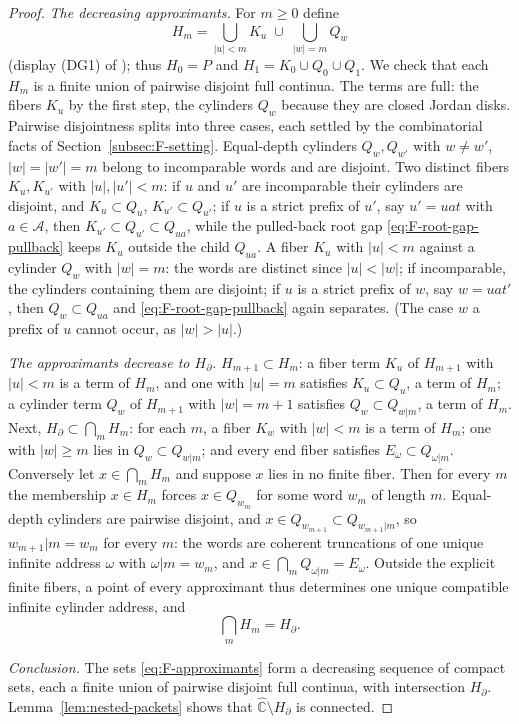 \documentclass[11pt,reqno]{amsart}
\theoremstyle{definition}
\theoremstyle{remark}
\newcommand{\Chat}{\widehat{\mathbb C}}
\begin{document}
\begin{proof}
\emph{The decreasing approximants.}
For $m\ge0$ define
\begin{equation}\label{eq:F-approximants}
H_m=\bigcup_{|u|<m}K_u\;\cup\;\bigcup_{|w|=m}Q_w
\end{equation}
(display (DG1) of \cite{MWman}); thus $H_0=P$ and
$H_1=K_0\cup Q_0\cup Q_1$.  We check that each $H_m$ is a finite union of
pairwise disjoint full continua.  The terms are full: the fibers $K_u$ by
the first step, the cylinders $Q_w$ because they are closed Jordan disks.
Pairwise disjointness splits into three cases, each settled by the
combinatorial facts of Section~\ref{subsec:F-setting}.
Equal-depth cylinders $Q_w,Q_{w'}$ with $w\ne w'$, $|w|=|w'|=m$ belong to
incomparable words and are disjoint.  Two distinct fibers $K_u,K_{u'}$
with $|u|,|u'|<m$: if $u$ and $u'$ are incomparable their cylinders are
disjoint, and $K_u\subset Q_u$, $K_{u'}\subset Q_{u'}$; if $u$ is a
strict prefix of $u'$, say $u'=uat$ with $a\in\mathcal A$, then
$K_{u'}\subset Q_{u'}\subset Q_{ua}$, while the pulled-back root gap
\eqref{eq:F-root-gap-pullback} keeps $K_u$ outside the child $Q_{ua}$.
A fiber $K_u$ with $|u|<m$ against a cylinder $Q_w$ with $|w|=m$: the
words are distinct since $|u|<|w|$; if incomparable, the cylinders
containing them are disjoint; if $u$ is a strict prefix of $w$, say
$w=uat'$, then $Q_w\subset Q_{ua}$ and \eqref{eq:F-root-gap-pullback}
again separates.  (The case $w$ a prefix of $u$ cannot occur, as
$|w|>|u|$.)

\emph{The approximants decrease to $H_\partial$.}
$H_{m+1}\subset H_m$: a fiber term $K_u$ of $H_{m+1}$ with $|u|<m$ is a
term of $H_m$, and one with $|u|=m$ satisfies $K_u\subset Q_u$, a term of
$H_m$; a cylinder term $Q_w$ of $H_{m+1}$ with $|w|=m+1$ satisfies
$Q_w\subset Q_{w|m}$, a term of $H_m$.  Next,
$H_\partial\subset\bigcap_mH_m$: for each $m$, a fiber $K_w$ with
$|w|<m$ is a term of $H_m$; one with $|w|\ge m$ lies in
$Q_w\subset Q_{w|m}$; and every end fiber satisfies
$E_\omega\subset Q_{\omega|m}$.  Conversely let
$x\in\bigcap_mH_m$ and suppose $x$ lies in no finite fiber.  Then for
every $m$ the membership $x\in H_m$ forces $x\in Q_{w_m}$ for some word
$w_m$ of length $m$.  Equal-depth cylinders are pairwise disjoint, and
$x\in Q_{w_{m+1}}\subset Q_{w_{m+1}|m}$, so $w_{m+1}|m=w_m$ for every
$m$: the words are coherent truncations of one unique infinite address
$\omega$ with $\omega|m=w_m$, and $x\in\bigcap_mQ_{\omega|m}=E_\omega$.
Outside the explicit finite fibers, a point of every approximant thus
determines one unique compatible infinite cylinder address, and
\[
\bigcap_m H_m=H_\partial .
\]

\emph{Conclusion.}
The sets \eqref{eq:F-approximants} form a decreasing sequence of compact
sets, each a finite union of pairwise disjoint full continua, with
intersection $H_\partial$.  Lemma~\ref{lem:nested-packets} shows that
$\Chat\setminus H_\partial$ is connected.
\end{proof}
\end{document}
